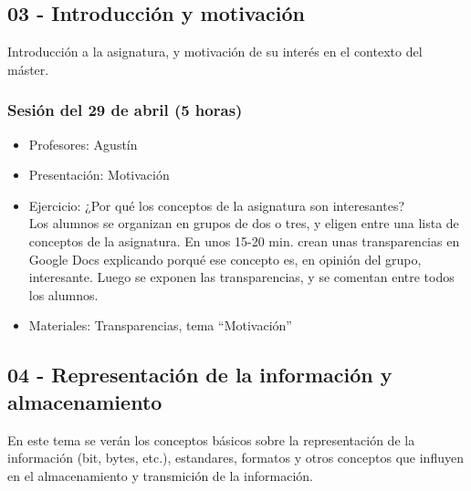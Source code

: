\documentclass[a4paper,12pt]{article}
\begin{document}
\subsection{03 - Introducción y motivación}

Introducción a la asignatura, y motivación de su interés en el contexto del máster.

\subsubsection{Sesión del 29 de abril (5 horas)}

\begin{itemize}
\item Profesores: Agustín
\item Presentación: Motivación
\item Ejercicio: ¿Por qué los conceptos de la asignatura son interesantes? \\
  Los alumnos se organizan en grupos de dos o tres, y eligen entre una lista de conceptos de la asignatura. En unos 15-20 min. crean unas transparencias en Google Docs explicando porqué ese concepto es, en opinión del grupo, interesante. Luego se exponen las transparencias, y se comentan entre todos los alumnos.
\item Materiales: Transparencias, tema ``Motivación''
\end{itemize}


\subsection{04 - Representación de la información y almacenamiento}

En este tema se verán los conceptos básicos sobre la representación de la información (bit, bytes, etc.), estandares, formatos y otros conceptos que influyen en el almacenamiento y transmición de la información.
\end{document}
